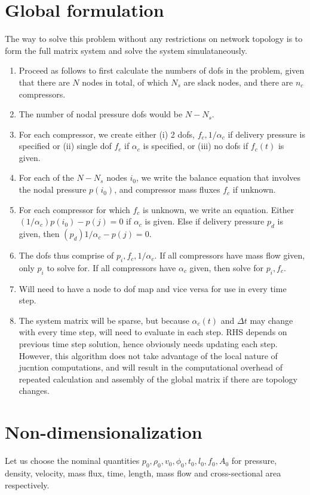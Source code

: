 \documentclass{amsart}
\begin{document}
\section{Global formulation}

The way to solve this problem without any restrictions on network topology is to form the full matrix system and solve the system simulataneously.
\begin{enumerate}
\item Proceed as follows to first calculate the numbers of dofs in the problem, given that there are $N$ nodes in total, of which $N_s$ are slack nodes, and there are $n_c$ compressors.
\item The number of nodal pressure dofs would be $N - N_s$. 
\item For each compressor, we create either (i) 2 dofs, $f_c, 1/\alpha_c$ if delivery pressure is specified or (ii) single dof $f_c$ if $\alpha_c$ is specified, or (iii) no dofs if $f_c(t)$ is given.
\item For each of the $N- N_s$ nodes $i_0$, we write the balance equation that involves the nodal pressure $p(i_0)$, and compressor mass fluxes $f_c$ if unknown. 
\item For each compressor for which $f_c$ is unknown, we write an equation. Either $(1/\alpha_c)p(i_0) - p(j) = 0$ if $\alpha_c$ is given. Else if delivery pressure $p_d$ is given, then $(p_d)1/\alpha_c - p(j) = 0$.
\item The dofs thus comprise of $p_i, f_c, 1/\alpha_c$. If all compressors have mass flow given, only $p_i$ to solve for. If all compressors have $\alpha_c$ given, then solve for $p_i, f_c$.
\item Will need to have a node to dof map and vice versa for use in every time step.
\item The system matrix will be sparse, but because $\alpha_c(t)$ and $\Delta t$ may change with every time step, will need to evaluate in each step. RHS depends on previous time step solution, hence obviously needs updating each step.
However, this algorithm does not take advantage of the local nature  of jucntion computations, and will result in the computational overhead  of repeated calculation and assembly of the global matrix if there are topology changes.
\end{enumerate}

\section{Non-dimensionalization}
Let us choose the nominal quantities $p_0, \rho_0, v_0, \phi_0, t_0, l_0,f_0, A_0$ for pressure, density, velocity, mass flux, time, length, mass flow and cross-sectional area respectively.
\end{document}
